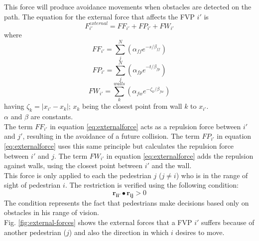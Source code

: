 \documentclass[english]{article}
\begin{document}
\begin{itemize}
\begin{itemize}
            This force will produce avoidance movements when obstacles are detected
            on the path. The equation for the external force that affects the FVP $i'$ is
            \begin{equation}
                F_{i'}^{external} = FF_{i'} + FP_{i'} + FW_{i'} \label{eq:externalforce}
            \end{equation}
            where 
            \[
                FF_{i'} = \sum_{j}^{N}(\alpha_{ff}e^{-s/\beta_{ff}})
            \]
            \[
                FP_{i'} = \sum_{j}^{N}(\alpha_{fp}e^{-t/\beta_{fp}})
            \]
            \[
                FW_{i'} = \sum_{k}^{walls}(\alpha_{fw}e^{-\zeta_{k} /\beta_{fw}})
            \]
            having $\zeta_{k} = |x_{i'} - x_{k}|$; $x_{k}$ being the closest point from wall 
            $k$ to $x_{i'}$. \\
            $\alpha$ and $\beta$ are constants. \\
            The term $FF_{i'}$ in equation \ref{eq:externalforce} acts as a repulsion force 
            between $i'$ and $j'$, resulting in the avoidance of a future collision. The term 
            $FP_{i'}$ in equation \ref{eq:externalforce} uses this same principle but 
            calculates the repulsion  force between $i'$ and $j$. The term $FW_{i'}$ in equation 
            \ref{eq:externalforce} adds the repulsion against walls,  using the closest point 
            between $i'$ and the wall. \\
            This force is only applied to each the pedestrian $j$ ($j\neq i$)
            who is in the range of sight of pedestrian $i$. The restriction
            is verified using the following condition:
            \[
                \mathbf{r_{ii'}}\bullet\mathbf{r_{ij}} > 0
            \]
            The condition represents the fact that pedestrians make decisions
            based only on obstacles in his range of vision. \\
            Fig. \ref{fig:external-forces} shows the external forces
            that a FVP $i'$ suffers because of another pedestrian ($j$)
            and also the direction in which $i$ desires to move.


\end{itemize}
\end{itemize}
\end{document}
